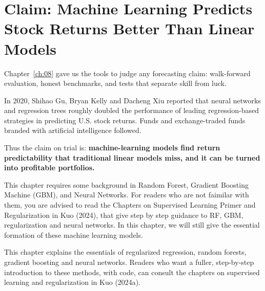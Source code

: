 \makeatletter
{}
\makeatother

\chapter{Claim: Machine Learning Predicts Stock Returns Better Than Linear Models}
\label{ch:19}


Chapter~\ref{ch:08} gave us the tools to judge any forecasting claim: walk-forward evaluation, honest benchmarks, and tests that separate skill from luck. 

In 2020, Shihao Gu, Bryan Kelly and Dacheng Xiu reported that neural networks and regression trees roughly doubled the performance of leading regression-based strategies in predicting U.S. stock returns. Funds and exchange-traded funds branded with artificial intelligence followed.

Thus the claim on trial is: \textbf{machine-learning models find return predictability that traditional linear models miss, and it can be turned into profitable portfolios.}

This chapter requires some background in Random Forest, Gradient Boosting Machine (GBM), and Neural Networks. For readers who are not faimilar with them, you are advised to read the Chapters on Supervised Learning Primer and Regularization in Kuo (2024), that give step by step guidance to RF, GBM, regularization and neural networks. In this chapter, we will still give the essential formation of these machine learning models.

This chapter explains the essentials of regularized regression, random forests, gradient boosting and neural networks. Readers who want a fuller, step-by-step introduction to these methods, with code, can consult the chapters on supervised learning and regularization in Kuo (2024a).

